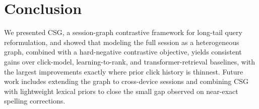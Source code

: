 \section{Conclusion}
\label{sec:conclusion}

We presented CSG, a session-graph contrastive framework for long-tail query
reformulation, and showed that modeling the full session as a heterogeneous graph,
combined with a hard-negative contrastive objective, yields consistent gains over
click-model, learning-to-rank, and transformer-retrieval baselines, with the largest
improvements exactly where prior click history is thinnest. Future work includes
extending the graph to cross-device sessions and combining CSG with lightweight
lexical priors to close the small gap observed on near-exact spelling corrections.
